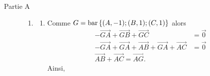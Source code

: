 	\begin{description}
		\item[Partie A]
			\begin{enumerate}
				\item \begin{enumerate}
					\item {}
						Comme $G = \mathrm{bar}\left\lbrace (A,-1);(B,1);(C,1) \right\rbrace$ alors 
						\begin{align*}
						-\overrightarrow{GA}+\overrightarrow{GB}+\overrightarrow{GC} & = \vec{0}	\\
						-\overrightarrow{GA}+\overrightarrow{GA}+\overrightarrow{AB}+\overrightarrow{GA}+\overrightarrow{AC}&=\vec{0}	\\
						\overrightarrow{AB}+\overrightarrow{AC}=\overrightarrow{AG}	.
						\end{align*}
						Ainsi, 
							

\end{enumerate}
\end{enumerate}
\end{description}
